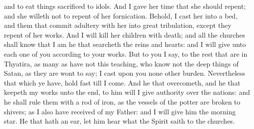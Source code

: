 and to eat things sacrificed to idols. And I gave her time that she should repent; and she willeth not to repent of her fornication. Behold, I cast her into a bed, and them that commit adultery with her into great tribulation, except they repent of her works. And I will kill her children with death; and all the churches shall know that I am he that searcheth the reins and hearts: and I will give unto each one of you according to your works. But to you I say, to the rest that are in Thyatira, as many as have not this teaching, who know not the deep things of Satan, as they are wont to say; I cast upon you none other burden. Nevertheless that which ye have, hold fast till I come. And he that overcometh, and he that keepeth my works unto the end, to him will I give authority over the nations: and he shall rule them with a rod of iron, as the vessels of the potter are broken to shivers; as I also have received of my Father: and I will give him the morning star. He that hath an ear, let him hear what the Spirit saith to the churches. 

